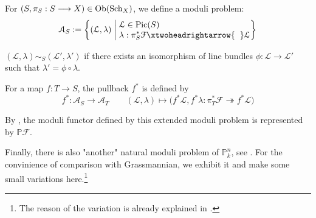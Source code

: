 \begin{eg}[{Projective bundle\footnote{There is an notational abuse in \cite{FOAG}. From my personal point of view, it's better to replace $\mathbb{P}\mathcal{F}$ with $\mathbb{P}\mathcal{F}^{\vee}$ or $\mathbb{P}V^{\vee}$ with $\mathbb{P}V$ to make symbols consistent. } $\mathbb{P}\mathcal{F}=\Proj(\Sym^{\bullet} \mathcal{F})$, see \cite[17.2.3]{FOAG}}]\hspace{1cm}

For $(S,\pi_S: S \longrightarrow X) \in \operatorname{Ob}(\operatorname{Sch}_{X})$, we define a moduli problem:
$$\mathcal{A}_S:=\left\{(\mathcal{L},\lambda)  \;\middle|\; \begin{aligned}
&\\[-5mm]
&\mathcal{L} \in \Pic(S)\\[-1mm]
& \lambda:\pi_S^* \mathcal{F} \xtwoheadrightarrow{\hspace{2mm}}  \mathcal{L}
\end{aligned}
 \right\}$$
 
   $(\mathcal{L},\lambda) \sim_S (\mathcal{L}',\lambda')$ if there exists an isomorphism of line bundles $\phi:\mathcal{L} \longrightarrow \mathcal{L}'$ such that $\lambda'=\phi \circ \lambda$.
   
   For a map $f:T \longrightarrow S$, the pullback $f^*$ is defined by
      $$f^*:\mathcal{A}_S \longrightarrow \mathcal{A}_T \qquad (\mathcal{L},\lambda) \longmapsto \big(f^*\mathcal{L},f^* \lambda:\pi_T^*\mathcal{F} \twoheadrightarrow f^*\mathcal{L}\big)$$
      
      By \cite[Proposition 7.12]{hartshorne2013algebraic}, the moduli functor defined by this extended moduli problem is represented by $\mathbb{P}\mathcal{F}$.
\end{eg}

Finally, there is also "another" natural moduli problem of $\mathbb{P}_k^n$, see \cite[Example 2.4]{modulicurve}. For the convinience of comparison with Grassmannian, we exhibit it and make some small variations here.\footnote{The reason of the variation is already explained in \cite[16.7, page 442]{FOAG}.}


